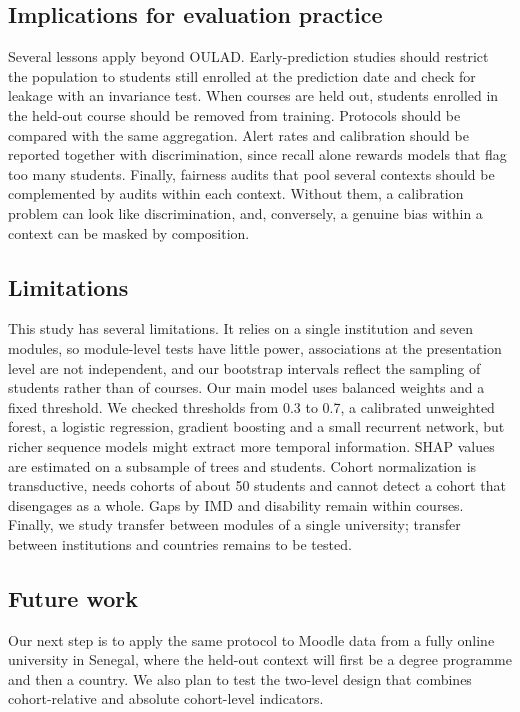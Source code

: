 \documentclass[journal]{IEEEtran}
\begin{document}
\subsection{Implications for evaluation practice}
Several lessons apply beyond OULAD. Early-prediction studies should restrict the population to students still enrolled at the prediction date and check for leakage with an invariance test. When courses are held out, students enrolled in the held-out course should be removed from training. Protocols should be compared with the same aggregation. Alert rates and calibration should be reported together with discrimination, since recall alone rewards models that flag too many students. Finally, fairness audits that pool several contexts should be complemented by audits within each context. Without them, a calibration problem can look like discrimination, and, conversely, a genuine bias within a context can be masked by composition.

\subsection{Limitations}
This study has several limitations. It relies on a single institution and seven modules, so module-level tests have little power, associations at the presentation level are not independent, and our bootstrap intervals reflect the sampling of students rather than of courses. Our main model uses balanced weights and a fixed threshold. We checked thresholds from 0.3 to 0.7, a calibrated unweighted forest, a logistic regression, gradient boosting and a small recurrent network, but richer sequence models might extract more temporal information. SHAP values are estimated on a subsample of trees and students. Cohort normalization is transductive, needs cohorts of about 50 students and cannot detect a cohort that disengages as a whole. Gaps by IMD and disability remain within courses. Finally, we study transfer between modules of a single university; transfer between institutions and countries remains to be tested.

\subsection{Future work}
Our next step is to apply the same protocol to Moodle data from a fully online university in Senegal, where the held-out context will first be a degree programme and then a country. We also plan to test the two-level design that combines cohort-relative and absolute cohort-level indicators.
\end{document}
